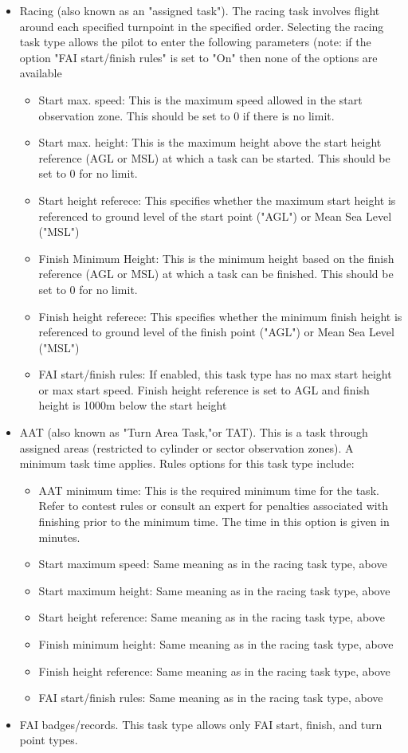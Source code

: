 \begin{itemize}
    \item Racing (also known as an "assigned task").  The racing task involves flight around each specified turnpoint in the specified order.  Selecting the racing task type allows the pilot to enter the following parameters (note: if the option "FAI start/finish rules" is set to "On" then none of the options are available %
\begin{itemize}
    \item Start max. speed: This is the maximum speed allowed in the start observation zone.  This should be set to 0 if there is no limit.
		\item Start max. height: This is the maximum height above the start height reference (AGL or MSL) at which a task can be started.  This  should be set to 0 for no limit.
	\item Start height referece: This specifies whether the maximum start height is referenced to ground level of the start point ("AGL") or Mean Sea Level ("MSL")
	\item Finish Minimum Height: This is the minimum height based on the finish reference (AGL or MSL) at which a task can be finished.  This should be set to 0 for no limit.
	\item Finish height referece: This specifies whether the minimum finish height is referenced to ground level of the finish point ("AGL") or Mean Sea Level ("MSL")
	\item FAI start/finish rules: If enabled, this task type has no max start height or max start speed.  Finish height reference is set to AGL and finish height is 1000m below the start height %
\end{itemize}
\item AAT (also known as "Turn Area Task,"or TAT).  This is a task through assigned areas (restricted to cylinder or sector observation zones).  A minimum task time applies.  Rules options for this task type include:
\begin{itemize}
    \item AAT minimum time:  This is the required minimum time for the task.  Refer to contest rules or consult an expert for penalties associated with finishing prior to the minimum time.  The time in this option is given in minutes.
	\item Start maximum speed: Same meaning as in the racing task type, above
	\item Start maximum height: Same meaning as in the racing task type, above
	\item Start height reference: Same meaning as in the racing task type, above
	\item Finish minimum height: Same meaning as in the racing task type, above
	\item Finish height reference: Same meaning as in the racing task type, above
	\item FAI start/finish rules: Same meaning as in the racing task type, above
\end{itemize}
\item FAI badges/records.  This task type allows only FAI start, finish, and turn point types.
\end{itemize}

